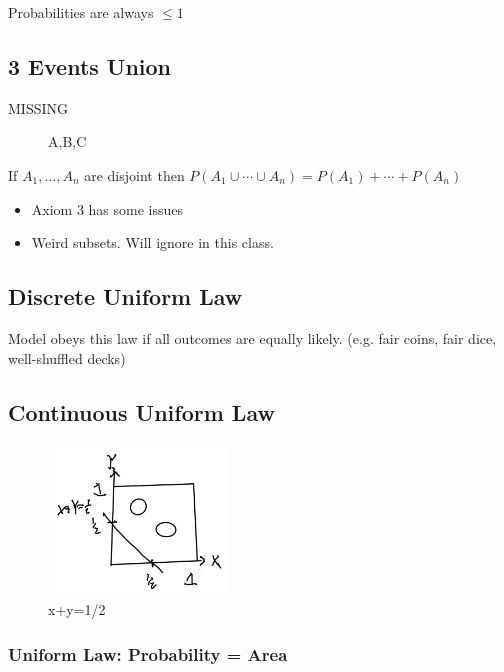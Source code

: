 \documentclass{article}
\begin{document}
Probabilities are always $\le 1$

\subsection{3 Events Union}

MISSING

\begin{figure}[!ht]
\centering
{}
\caption{A,B,C} \label{fig:M3}
\end{figure}

If $A_1,\ldots, A_n$ are disjoint then $P(A_1 \cup \cdots \cup A_n) = P(A_1) + \cdots + P(A_n)$

\begin{itemize}
    \item Axiom 3 has some issues 
    \item Weird subsets.  Will ignore in this class.
\end{itemize}

\subsection{Discrete Uniform Law}

Model obeys this law if all outcomes are equally likely. (e.g. fair coins, fair dice, well-shuffled decks)

\subsection{Continuous Uniform Law}

\begin{figure}[!ht]
\centering
\includegraphics[width=5cm, height=4cm]{images/L01/cont_unif_law.jpeg}
\caption{x+y=1/2}
\end{figure}

\subsubsection{Uniform Law: Probability = Area}
\end{document}
